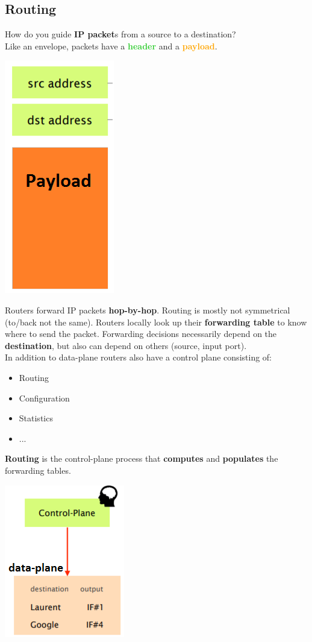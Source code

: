 \documentclass[a4paper, fontsize=8pt, landscape, DIV=1]{scrartcl}
\begin{document}
\begin{multicols*}{4}
			\subsection{Routing}
			How do you guide \textbf{IP packet}s from a source to a destination? \\
			Like an envelope, packets have a \textcolor{LimeGreen}{\textbf{header}} and a \textcolor{Orange}{\textbf{payload}}.\\ 
			\begin{center}
			\includegraphics[height=0.4\columnwidth]{images/Concepts/IP_packet.png}
			\end{center}
			Routers forward IP packets \textbf{hop-by-hop}. Routing is mostly not symmetrical (to/back not the same). Routers locally look up their \textbf{forwarding table} to know where to send the packet. Forwarding decisions necessarily depend on the \textbf{destination}, but also can depend on others (source, input port).\\
			In addition to data-plane routers also have a control plane consisting of:
			\vspace{-0.2cm}
			\begin{itemize}[noitemsep]
				\item Routing
				\item Configuration
				\item Statistics
				\item ... 
			\end{itemize}  
			\textbf{Routing} is the control-plane process that \textbf{computes} and \textbf{populates} the forwarding tables.
			\begin{center}
				\includegraphics[height=0.4\columnwidth]{images/Concepts/control_data_plane.png}

\end{center}
\end{multicols*}
\end{document}
